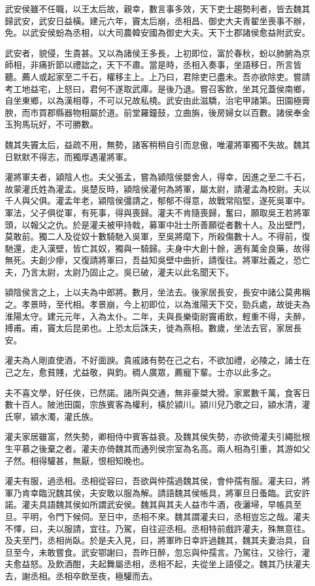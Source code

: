 武安侯雖不任職，以王太后故，親幸，數言事多效，天下吏士趨勢利者，皆去魏其歸武安，武安日益橫。建元六年，竇太后崩，丞相昌、御史大夫青翟坐喪事不辦，免。以武安侯蚡為丞相，以大司農韓安國為御史大夫。天下士郡諸侯愈益附武安。

武安者，貌侵，生貴甚。又以為諸侯王多長，上初即位，富於春秋，蚡以肺腑為京師相，非痛折節以禮詘之，天下不肅。當是時，丞相入奏事，坐語移日，所言皆聽。薦人或起家至二千石，權移主上。上乃曰，君除吏已盡未。吾亦欲除吏。嘗請考工地益宅，上怒曰，君何不遂取武庫。是後乃退。嘗召客飲，坐其兄蓋侯南鄉，自坐東鄉，以為漢相尊，不可以兄故私橈。武安由此滋驕，治宅甲諸第。田園極膏腴，而市買郡縣器物相屬於道。前堂羅鐘鼓，立曲旃，後房婦女以百數。諸侯奉金玉狗馬玩好，不可勝數。

魏其失竇太后，益疏不用，無勢，諸客稍稍自引而怠傲，唯灌將軍獨不失故。魏其日默默不得志，而獨厚遇灌將軍。

灌將軍夫者，潁陰人也。夫父張孟，嘗為潁陰侯嬰舍人，得幸，因進之至二千石，故蒙灌氏姓為灌孟。吳楚反時，潁陰侯灌何為將軍，屬太尉，請灌孟為校尉。夫以千人與父俱。灌孟年老，潁陰侯彊請之，郁郁不得意，故戰常陷堅，遂死吳軍中。軍法，父子俱從軍，有死事，得與喪歸。灌夫不肯隨喪歸，奮曰，願取吳王若將軍頭，以報父之仇。於是灌夫被甲持戟，募軍中壯士所善願從者數十人。及出壁門，莫敢前。獨二人及從奴十數騎馳入吳軍，至吳將麾下，所殺傷數十人。不得前，復馳還，走入漢壁，皆亡其奴，獨與一騎歸。夫身中大創十餘，適有萬金良藥，故得無死。夫創少瘳，又復請將軍曰，吾益知吳壁中曲折，請復往。將軍壯義之，恐亡夫，乃言太尉，太尉乃固止之。吳已破，灌夫以此名聞天下。

潁陰侯言之上，上以夫為中郎將。數月，坐法去。後家居長安，長安中諸公莫弗稱之。孝景時，至代相。孝景崩，今上初即位，以為淮陽天下交，勁兵處，故徙夫為淮陽太守。建元元年，入為太仆。二年，夫與長樂衛尉竇甫飲，輕重不得，夫醉，搏甫。甫，竇太后昆弟也。上恐太后誅夫，徙為燕相。數歲，坐法去官，家居長安。

灌夫為人剛直使酒，不好面諛。貴戚諸有勢在己之右，不欲加禮，必陵之，諸士在己之左，愈貧賤，尤益敬，與鈞。稠人廣眾，薦寵下輩。士亦以此多之。

夫不喜文學，好任俠，已然諾。諸所與交通，無非豪桀大猾。家累數千萬，食客日數十百人。陂池田園，宗族賓客為權利，橫於潁川。潁川兒乃歌之曰，潁水清，灌氏寧，潁水濁，灌氏族。

灌夫家居雖富，然失勢，卿相侍中賓客益衰。及魏其侯失勢，亦欲倚灌夫引繩批根生平慕之後棄之者。灌夫亦倚魏其而通列侯宗室為名高。兩人相為引重，其游如父子然。相得驩甚，無厭，恨相知晚也。

灌夫有服，過丞相。丞相從容曰，吾欲與仲孺過魏其侯，會仲孺有服。灌夫曰，將軍乃肯幸臨況魏其侯，夫安敢以服為解。請語魏其侯帳具，將軍旦日蚤臨。武安許諾。灌夫具語魏其侯如所謂武安侯。魏其與其夫人益市牛酒，夜灑埽，早帳具至旦。平明，令門下候伺。至日中，丞相不來。魏其謂灌夫曰，丞相豈忘之哉。灌夫不懌，曰，夫以服請，宜往。乃駕，自往迎丞相。丞相特前戲許灌夫，殊無意往。及夫至門，丞相尚臥。於是夫入見，曰，將軍昨日幸許過魏其，魏其夫妻治具，自旦至今，未敢嘗食。武安鄂謝曰，吾昨日醉，忽忘與仲孺言。乃駕往，又徐行，灌夫愈益怒。及飲酒酣，夫起舞屬丞相，丞相不起，夫從坐上語侵之。魏其乃扶灌夫去，謝丞相。丞相卒飲至夜，極驩而去。

